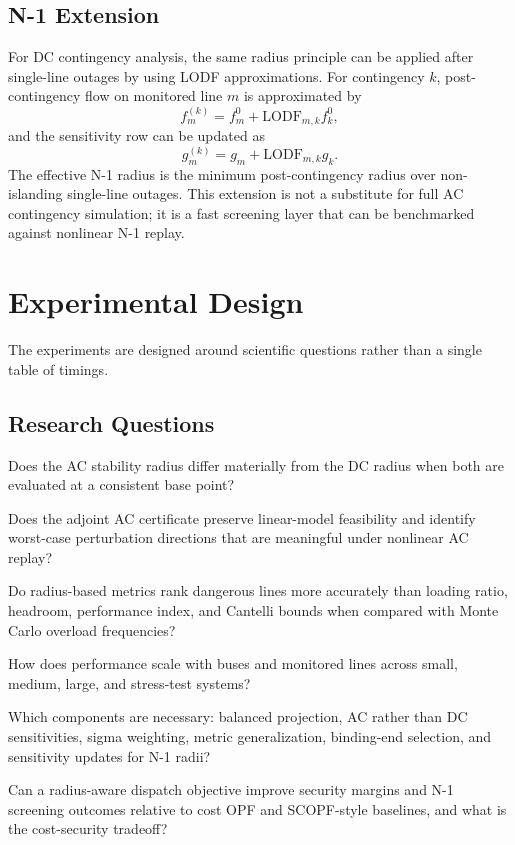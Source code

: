 \documentclass[11pt]{article}
\begin{document}
\subsection{N-1 Extension}

For DC contingency analysis, the same radius principle can be applied after single-line outages by using LODF approximations. For contingency $k$, post-contingency flow on monitored line $m$ is approximated by
\begin{equation}
  f_m^{(k)}=f_m^0+\mathrm{LODF}_{m,k} f_k^0,
\end{equation}
and the sensitivity row can be updated as
\begin{equation}
  g_m^{(k)}=g_m+\mathrm{LODF}_{m,k}g_k.
\end{equation}
The effective N-1 radius is the minimum post-contingency radius over non-islanding single-line outages. This extension is not a substitute for full AC contingency simulation; it is a fast screening layer that can be benchmarked against nonlinear N-1 replay.

\section{Experimental Design}
\label{sec:evaluation}

The experiments are designed around scientific questions rather than a single table of timings.

\subsection{Research Questions}

\begin{description}[leftmargin=*]
  \item[RQ1.] Does the AC stability radius differ materially from the DC radius when both are evaluated at a consistent base point?
  \item[RQ2.] Does the adjoint AC certificate preserve linear-model feasibility and identify worst-case perturbation directions that are meaningful under nonlinear AC replay?
  \item[RQ3.] Do radius-based metrics rank dangerous lines more accurately than loading ratio, headroom, performance index, and Cantelli bounds when compared with Monte Carlo overload frequencies?
  \item[RQ4.] How does performance scale with buses and monitored lines across small, medium, large, and stress-test systems?
  \item[RQ5.] Which components are necessary: balanced projection, AC rather than DC sensitivities, sigma weighting, metric generalization, binding-end selection, and sensitivity updates for N-1 radii?
  \item[RQ6.] Can a radius-aware dispatch objective improve security margins and N-1 screening outcomes relative to cost OPF and SCOPF-style baselines, and what is the cost-security tradeoff?
\end{description}
\end{document}
